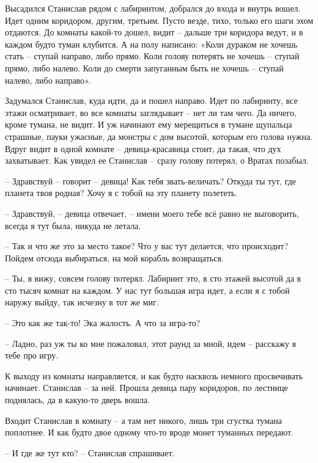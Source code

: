 \documentclass[ebook,oneside,final,openright]{memoir}
\begin{document}
\par
Высадился Станислав рядом с лабиринтом, добрался до входа и внутрь вошел. Идет одним коридором, другим, третьим. Пусто везде, тихо, только его шаги эхом отдаются. До комнаты какой-то дошел, видит – дальше три коридора ведут, и в каждом будто туман клубится. А на полу написано: «Коли дураком не хочешь стать – ступай направо, либо прямо. Коли голову потерять не хочешь – ступай прямо, либо налево. Коли до смерти запуганным быть не хочешь – ступай налево, либо направо».\par
\par
Задумался Станислав, куда идти, да и пошел направо. Идет по лабиринту, все этажи осматривает, во все комнаты заглядывает – нет ли там чего. Да ничего, кроме тумана, не видит. И уж начинают ему мерещиться в тумане щупальца страшные, пауки ужасные, да монстры с дом высотой, которым его голова нужна. Вдруг видит в одной комнате – девица-красавица стоит, да такая, что дух захватывает. Как увидел ее Станислав – сразу голову потерял, о Вратах позабыл.\par
\par
– Здравствуй – говорит – девица! Как тебя звать-величать? Откуда ты тут, где планета твоя родная? Хочу я с тобой на эту планету полететь.\par
– Здравствуй, – девица отвечает, – имени моего тебе всё равно не выговорить, всегда я тут была, никуда не летала.\par
– Так и что же это за место такое? Что у вас тут делается, что происходит? Пойдем отсюда выбираться, на мой корабль возвращаться.\par
– Ты, я вижу, совсем голову потерял. Лабиринт это, в сто этажей высотой да в сто тысяч комнат на каждом. У нас тут большая игра идет, а если я с тобой наружу выйду, так исчезну в тот же миг.\par
– Это как же так-то! Эка жалость. А что за игра-то?\par
– Ладно, раз уж ты ко мне пожаловал, этот раунд за мной, идем – расскажу я тебе про игру.\par
\par
К выходу из комнаты направляется, и как будто насквозь немного просвечивать начинает. Станислав – за ней. Прошла девица пару коридоров, по лестнице поднялась, да в какую-то дверь вошла. \par
Входит Станислав в комнату – а там нет никого, лишь три сгустка тумана поплотнее. И как будто двое одному что-то вроде монет туманных передают.\par
– И где же тут кто? – Станислав спрашивает.\par
\end{document}
